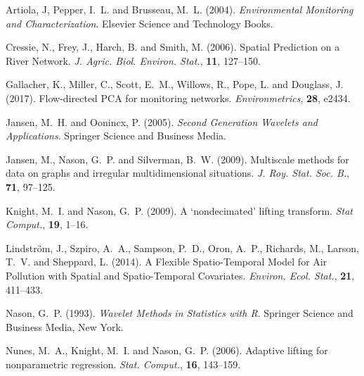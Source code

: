 \documentclass[11pt,titlepage]{article}
\begin{document}
\begin{thebibliography}{}


Artiola, J, Pepper, I.~L. and Brusseau, M.~L. (2004). {\em Environmental Monitoring and Characterization}. Elsevier Science and Technology Books.

Cressie, N., Frey, J., Harch, B. and Smith, M. (2006). Spatial Prediction on a River Network. {\em J. Agric. Biol. Environ. Stat.}, {\bf 11}, 127--150.

Gallacher, K., Miller, C., Scott, E.~M., Willows, R., Pope, L. and Douglass, J. (2017). Flow-directed PCA for monitoring networks. {\em Environmetrics}, {\bf 28}, e2434. 

Jansen, M.~H. and Oonincx, P. (2005). {\em Second Generation Wavelets and Applications}. Springer Science and Business Media.

Jansen, M., Nason, G.~P. and Silverman, B.~W. (2009). Multiscale methods for data on graphs and irregular multidimensional situations. {\em J. Roy. Stat. Soc. B.}, {\bf 71}, 97--125.

Knight, M.~I. and Nason, G.~P. (2009). A `nondecimated' lifting transform. {\em Stat Comput.}, {\bf 19}, 1--16.

Lindstr\"{o}m, J., Szpiro, A.~A., Sampson, P.~D., Oron, A.~P., Richards, M., Larson, T.~V. and Sheppard, L. (2014). A Flexible Spatio-Temporal Model for Air Pollution with Spatial and Spatio-Temporal Covariates. {\em Environ. Ecol. Stat.}, {\bf 21}, 411--433. 

Nason, G.~P. (1993). {\em Wavelet Methods in Statistics with R}. Springer Science and Business Media, New York.

Nunes, M.~A., Knight, M.~I. and Nason, G.~P. (2006). Adaptive lifting for nonparametric regression. {\em Stat. Comput.}, {\bf 16}, 143--159.


\end{thebibliography}
\end{document}
